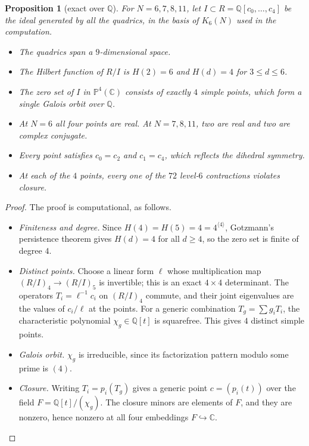 \documentclass[11pt]{amsart}
\newtheorem{proposition}[theorem]{Proposition}
\theoremstyle{definition}
\theoremstyle{remark}
\theoremstyle{plain}
\numberwithin{equation}{section}
\numberwithin{table}{section}
\newcommand{\C}{\mathbb C}
\newcommand{\Q}{\mathbb Q}
\begin{document}
\begin{proposition}[exact over $\Q$]\label{prop:quad}
For $N=6,7,8,11$, let $I\subset R=\Q[c_0,\dots,c_4]$ be the ideal generated by all the quadrics, in the basis of $K_6(N)$ used in the computation.
\begin{itemize}
\item The quadrics span a $9$-dimensional space.
\item The Hilbert function of $R/I$ is $H(2)=6$ and $H(d)=4$ for $3\le d\le6$.
\item The zero set of $I$ in $\mathbb P^4(\C)$ consists of exactly $4$ simple points, which form a single Galois orbit over $\Q$.
\item At $N=6$ all four points are real. At $N=7,8,11$, two are real and two are complex conjugate.
\item Every point satisfies $c_0=c_2$ and $c_1=c_4$, which reflects the dihedral symmetry.
\item At each of the $4$ points, every one of the $72$ level-$6$ contractions violates closure.
\end{itemize}
\end{proposition}

\begin{proof}
The proof is computational, as follows.
\begin{itemize}
\item \emph{Finiteness and degree.} Since $H(4)=H(5)=4=4^{\langle4\rangle}$, Gotzmann's persistence theorem gives $H(d)=4$ for all $d\ge4$, so the zero set is finite of degree $4$.
\item \emph{Distinct points.} Choose a linear form $\ell$ whose multiplication map $(R/I)_4\to(R/I)_5$ is invertible; this is an exact $4\times4$ determinant. The operators $T_i=\ell^{-1}c_i$ on $(R/I)_4$ commute, and their joint eigenvalues are the values of $c_i/\ell$ at the points. For a generic combination $T_g=\sum g_iT_i$, the characteristic polynomial $\chi_g\in\Q[t]$ is squarefree. This gives $4$ distinct simple points.
\item \emph{Galois orbit.} $\chi_g$ is irreducible, since its factorization pattern modulo some prime is $(4)$.
\item \emph{Closure.} Writing $T_i=p_i(T_g)$ gives a generic point $c=(p_i(t))$ over the field $F=\Q[t]/(\chi_g)$. The closure minors are elements of $F$, and they are nonzero, hence nonzero at all four embeddings $F\hookrightarrow\C$. \qedhere
\end{itemize}
\end{proof}
\end{document}

